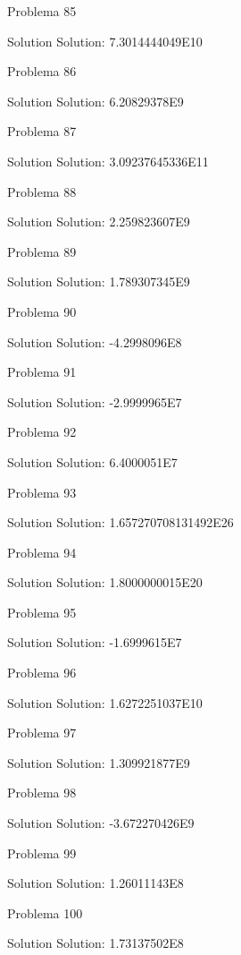 \documentclass{article}
\begin{document}
Problema 85

Solution Solution: 7.3014444049E10

Problema 86

Solution Solution: 6.20829378E9

Problema 87

Solution Solution: 3.09237645336E11

Problema 88

Solution Solution: 2.259823607E9

Problema 89

Solution Solution: 1.789307345E9

Problema 90

Solution Solution: -4.2998096E8

Problema 91

Solution Solution: -2.9999965E7

Problema 92

Solution Solution: 6.4000051E7

Problema 93

Solution Solution: 1.657270708131492E26

Problema 94

Solution Solution: 1.8000000015E20

Problema 95

Solution Solution: -1.6999615E7

Problema 96

Solution Solution: 1.6272251037E10

Problema 97

Solution Solution: 1.309921877E9

Problema 98

Solution Solution: -3.672270426E9

Problema 99

Solution Solution: 1.26011143E8

Problema 100

Solution Solution: 1.73137502E8
\end{document}
